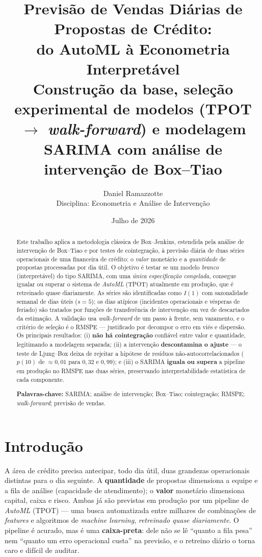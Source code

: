 \documentclass[11pt,a4paper]{article}
\title{\vspace{-1.2cm}\textbf{Previsão de Vendas Diárias de Propostas de Crédito:\\[3pt]
do AutoML à Econometria Interpretável}\\[6pt]
\large Construção da base, seleção experimental de modelos (TPOT $\rightarrow$ \emph{walk-forward})
e modelagem SARIMA com análise de intervenção de Box--Tiao}
\author{Daniel Ramazzotte\\[2pt]
\small Disciplina: Econometria e Análise de Intervenção}
\date{Julho de 2026}
\begin{document}
\maketitle

\begin{abstract}
\noindent
Este trabalho aplica a metodologia clássica de Box--Jenkins, estendida pela análise de
intervenção de Box--Tiao e por testes de cointegração, à previsão diária de duas séries
operacionais de uma financeira de crédito: o \emph{valor} monetário e a \emph{quantidade} de
propostas processadas por dia útil. O objetivo é testar se um modelo \emph{branco} (interpretável)
do tipo SARIMA, com uma \emph{única especificação congelada}, consegue igualar ou superar o
sistema de \emph{AutoML} (TPOT) atualmente em produção, que é retreinado quase diariamente. As
séries são identificadas como $I(1)$ com sazonalidade semanal de dias úteis ($s=5$);
os dias atípicos (incidentes operacionais e vésperas de feriado) são tratados por funções de
transferência de intervenção em vez de descartados da estimação. A validação usa
\emph{walk-forward} de um passo à frente, sem vazamento, e o critério de seleção é o RMSPE ---
justificado por decompor o erro em viés e dispersão. Os principais resultados: (i) \textbf{não há
cointegração} confiável entre valor e quantidade, legitimando a modelagem separada; (ii) a
intervenção \textbf{descontamina o ajuste} --- o teste de Ljung--Box deixa de rejeitar a hipótese
de resíduos não-autocorrelacionados ($p(10)$ de $\approx 0{,}01$ para $0{,}32$ e $0{,}99$); e (iii) o
SARIMA \textbf{iguala ou supera} a pipeline em produção no RMSPE nas duas séries, preservando
interpretabilidade estatística de cada componente.

\vspace{4pt}
\noindent\textbf{Palavras-chave:} SARIMA; análise de intervenção; Box--Tiao; cointegração;
RMSPE; \emph{walk-forward}; previsão de vendas.
\end{abstract}

\section{Introdução}
\label{sec:intro}

A área de crédito precisa antecipar, todo dia útil, duas grandezas operacionais distintas para o
dia seguinte. A \textbf{quantidade} de propostas dimensiona a equipe e a fila de análise
(capacidade de atendimento); o \textbf{valor} monetário dimensiona capital, caixa e risco. Ambas
já são previstas em produção por um pipeline de \emph{AutoML} (TPOT) --- uma busca automatizada
entre milhares de combinações de \emph{features} e algoritmos de \emph{machine learning},
\emph{retreinado quase diariamente}. O pipeline é acurado, mas é uma \textbf{caixa-preta}: dele não
se lê ``quanto a fila pesa'' nem ``quanto um erro operacional custa'' na previsão, e o retreino
diário o torna caro e difícil de auditar.
\end{document}
